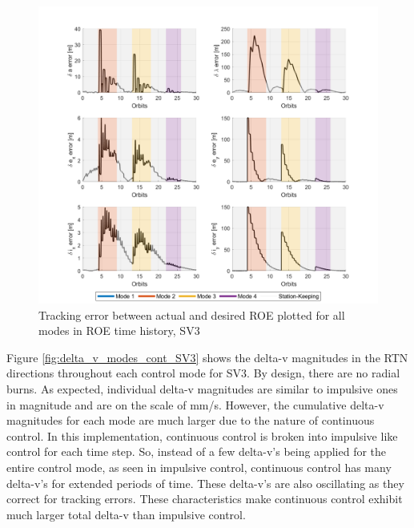 \begin{figure}[H]
    \centering
    \includegraphics[width=0.75\linewidth]{sim/figures/PS6/ROE_error_over_time_modes_SV3.png}
    \caption{Tracking error between actual and desired ROE plotted for all modes in ROE time history, SV3}
    \label{fig:roe_error_time_modes_cont_SV3}
\end{figure}

Figure \ref{fig:delta_v_modes_cont_SV3} shows the delta-v magnitudes in the RTN directions throughout each control mode for SV3. By design, there are no radial burns. As expected, individual delta-v magnitudes are similar to impulsive ones in magnitude and are on the scale of mm/s. However, the cumulative delta-v magnitudes for each mode are much larger due to the nature of continuous control. In this implementation, continuous control is broken into impulsive like control for each time step. So, instead of a few delta-v's being applied for the entire control mode, as seen in impulsive control, continuous control has many delta-v's for extended periods of time. These delta-v's are also oscillating as they correct for tracking errors. These characteristics make continuous control exhibit much larger total delta-v than impulsive control. 

